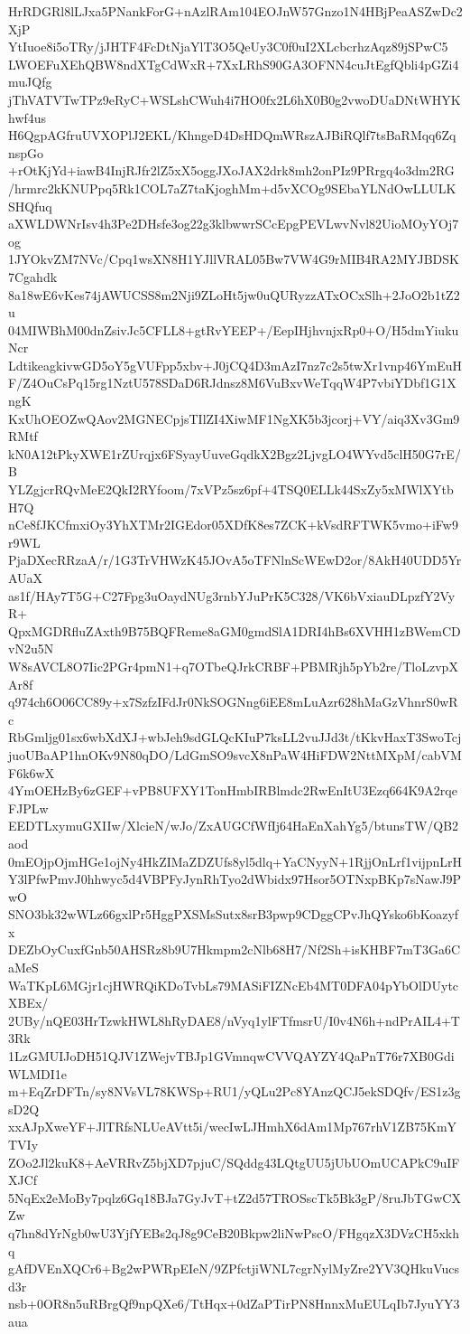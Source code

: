 HrRDGRl8lLJxa5PNankForG+nAzlRAm104EOJnW57Gnzo1N4HBjPeaASZwDc2XjP
YtIuoe8i5oTRy/jJHTF4FcDtNjaYlT3O5QeUy3C0f0uI2XLcbcrhzAqz89jSPwC5
LWOEFuXEhQBW8ndXTgCdWxR+7XxLRhS90GA3OFNN4cuJtEgfQbli4pGZi4muJQfg
jThVATVTwTPz9eRyC+WSLshCWuh4i7HO0fx2L6hX0B0g2vwoDUaDNtWHYKhwf4us
H6QgpAGfruUVXOPlJ2EKL/KhngeD4DsHDQmWRszAJBiRQlf7tsBaRMqq6ZqnspGo
+rOtKjYd+iawB4InjRJfr2lZ5xX5oggJXoJAX2drk8mh2onPIz9PRrgq4o3dm2RG
/hrmrc2kKNUPpq5Rk1COL7aZ7taKjoghMm+d5vXCOg9SEbaYLNdOwLLULKSHQfuq
aXWLDWNrIsv4h3Pe2DHsfe3og22g3klbwwrSCcEpgPEVLwvNvl82UioMOyYOj7og
1JYOkvZM7NVc/Cpq1wsXN8H1YJllVRAL05Bw7VW4G9rMIB4RA2MYJBDSK7Cgahdk
8a18wE6vKes74jAWUCSS8m2Nji9ZLoHt5jw0uQURyzzATxOCxSlh+2JoO2b1tZ2u
04MIWBhM00dnZsivJc5CFLL8+gtRvYEEP+/EepIHjhvnjxRp0+O/H5dmYiukuNcr
LdtikeagkivwGD5oY5gVUFpp5xbv+J0jCQ4D3mAzI7nz7c2s5twXr1vnp46YmEuH
F/Z4OuCsPq15rg1NztU578SDaD6RJdnsz8M6VuBxvWeTqqW4P7vbiYDbf1G1XngK
KxUhOEOZwQAov2MGNECpjsTIlZI4XiwMF1NgXK5b3jcorj+VY/aiq3Xv3Gm9RMtf
kN0A12tPkyXWE1rZUrqjx6FSyayUuveGqdkX2Bgz2LjvgLO4WYvd5clH50G7rE/B
YLZgjcrRQvMeE2QkI2RYfoom/7xVPz5sz6pf+4TSQ0ELLk44SxZy5xMWlXYtbH7Q
nCe8fJKCfmxiOy3YhXTMr2IGEdor05XDfK8es7ZCK+kVsdRFTWK5vmo+iFw9r9WL
PjaDXecRRzaA/r/1G3TrVHWzK45JOvA5oTFNlnScWEwD2or/8AkH40UDD5YrAUaX
as1f/HAy7T5G+C27Fpg3uOaydNUg3rnbYJuPrK5C328/VK6bVxiauDLpzfY2VyR+
QpxMGDRfluZAxth9B75BQFReme8aGM0gmdSlA1DRI4hBs6XVHH1zBWemCDvN2u5N
W8sAVCL8O7Iic2PGr4pmN1+q7OTbeQJrkCRBF+PBMRjh5pYb2re/TloLzvpXAr8f
q974ch6O06CC89y+x7SzfzIFdJr0NkSOGNng6iEE8mLuAzr628hMaGzVhnrS0wRc
RbGmljg01sx6wbXdXJ+wbJeh9sdGLQcKIuP7ksLL2vuJJd3t/tKkvHaxT3SwoTcj
juoUBaAP1hnOKv9N80qDO/LdGmSO9svcX8nPaW4HiFDW2NttMXpM/cabVMF6k6wX
4YmOEHzBy6zGEF+vPB8UFXY1TonHmbIRBlmdc2RwEnItU3Ezq664K9A2rqeFJPLw
EEDTLxymuGXIIw/XlcieN/wJo/ZxAUGCfWfIj64HaEnXahYg5/btunsTW/QB2aod
0mEOjpOjmHGe1ojNy4HkZIMaZDZUfs8yl5dlq+YaCNyyN+1RjjOnLrf1vijpnLrH
Y3lPfwPmvJ0hhwyc5d4VBPFyJynRhTyo2dWbidx97Hsor5OTNxpBKp7sNawJ9PwO
SNO3bk32wWLz66gxlPr5HggPXSMsSutx8srB3pwp9CDggCPvJhQYsko6bKoazyfx
DEZbOyCuxfGnb50AHSRz8b9U7Hkmpm2cNlb68H7/Nf2Sh+isKHBF7mT3Ga6CaMeS
WaTKpL6MGjr1cjHWRQiKDoTvbLs79MASiFIZNcEb4MT0DFA04pYbOlDUytcXBEx/
2UBy/nQE03HrTzwkHWL8hRyDAE8/nVyq1ylFTfmsrU/I0v4N6h+ndPrAIL4+T3Rk
1LzGMUIJoDH51QJV1ZWejvTBJp1GVmnqwCVVQAYZY4QaPnT76r7XB0GdiWLMDI1e
m+EqZrDFTn/sy8NVsVL78KWSp+RU1/yQLu2Pc8YAnzQCJ5ekSDQfv/ES1z3gsD2Q
xxAJpXweYF+JlTRfsNLUeAVtt5i/wecIwLJHmhX6dAm1Mp767rhV1ZB75KmYTVIy
ZOo2Jl2kuK8+AeVRRvZ5bjXD7pjuC/SQddg43LQtgUU5jUbUOmUCAPkC9uIFXJCf
5NqEx2eMoBy7pqlz6Gq18BJa7GyJvT+tZ2d57TROSscTk5Bk3gP/8ruJbTGwCXZw
q7hn8dYrNgb0wU3YjfYEBs2qJ8g9CeB20Bkpw2liNwPscO/FHgqzX3DVzCH5xkhq
gAfDVEnXQCr6+Bg2wPWRpEIeN/9ZPfctjiWNL7cgrNylMyZre2YV3QHkuVucsd3r
nsb+0OR8n5uRBrgQf9npQXe6/TtHqx+0dZaPTirPN8HnnxMuEULqIb7JyuYY3aua
